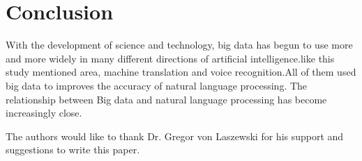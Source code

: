 \documentclass[sigconf]{acmart}
\begin{document}
\section{Conclusion}
With the development of science and technology, big data has begun to use more and more widely in many different directions of artificial intelligence.like this study mentioned area, machine translation and voice recognition.All of them used big data to improves the accuracy of natural language processing. The relationship between Big data and natural language processing has become increasingly close.


\begin{acks}

  The authors would like to thank Dr. Gregor von Laszewski for his
  support and suggestions to write this paper.

\end{acks}


 
\end{document}
